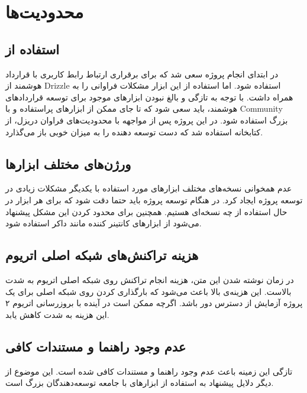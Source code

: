\section{محدودیت‌ها}

\subsection{استفاده از }
در ابتدای انجام پروژه سعی شد که برای برقراری ارتباط رابط کاربری با قرارداد هوشمند از
\gls{Drizzle}
استفاده شود.
اما استفاده از این ابزار مشکلات فراوانی را به همراه داشت.
با توجه به تازگی و بالغ نبودن ابزارهای موجود برای توسعه قراردادهای هوشمند،
باید سعی شود که تا جای ممکن از ابزارهای پراستفاده و با
\gls{Community}
بزرگ استفاده شود. در این پروژه پس از مواجهه با محدودیت‌های فراوان دریزل،
از کتابخانه‌  استفاده شد که دست توسعه دهنده را به میزان خوبی باز می‌گذارد.

\subsection{ورژن‌های مختلف ابزارها}
عدم همخوانی نسخه‌های مختلف ابزارهای مورد استفاده با یکدیگر مشکلات زیادی در توسعه پروژه ایجاد کرد.
در هنگام توسعه پروژه باید حتما دقت شود که برای هر ابزار در حال استفاده از چه نسخه‌ای هستیم.
همچنین برای محدود کردن این مشکل پیشنهاد می‌شود از ابزارهای کانتینر کننده مانند داکر استفاده شود.

\subsection{هزینه تراکنش‌های شبکه اصلی اتریوم}
در زمان نوشته شدن این متن، هزینه انجام تراکنش روی شبکه اصلی اتریوم به شدت بالاست.
این هزینه‌ی بالا باعث می‌شود که بارگذاری کردن روی شبکه اصلی برای یک پروژه آزمایش از دسترس دور باشد.
اگرچه ممکن است در آینده با بروزرسانی اتریوم ۲ این هزینه به شدت کاهش یابد.

\subsection{عدم وجود راهنما و مستندات کافی}
تازگی این زمینه باعث عدم وجود راهنما و مستندات کافی شده است.
این موضوع از دیگر دلایل پیشنهاد به استفاده از ابزارهای با جامعه توسعه‌دهندگان بزرگ است.

